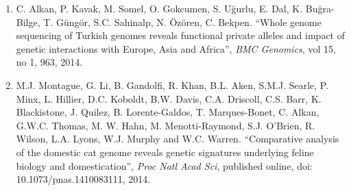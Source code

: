 \begin{enumerate}[i)]
\begin{enumerate}
\item C. Alkan, P. Kavak, M. Somel, O. Gokcumen, S. Uğurlu, E. Dal, K. Buğra-Bilge,  T. Güngör, S.C. Sahinalp, N. Özören, C. Bekpen. ``Whole genome sequencing of Turkish genomes reveals functional private alleles and impact of genetic interactions with Europe, Asia and Africa'', {\em BMC Genomics}, vol 15, no 1, 963, 2014.


\item M.J. Montague, G. Li, B. Gandolfi, R. Khan, B.L. Aken, S.M.J. Searle, P. Minx, L. Hillier, D.C. Koboldt, B.W. Davis, C.A. Driscoll, C.S. Barr, K. Blackistone, J. Quilez, B. Lorente-Galdos, T. Marques-Bonet, C. Alkan, G.W.C. Thomas, M. W. Hahn, M. Menotti-Raymond, S.J. O’Brien, R. Wilson, L.A. Lyons, W.J. Murphy and W.C. Warren. ``Comparative analysis of the domestic cat genome reveals genetic signatures underlying feline biology and domestication'', {\em Proc Natl Acad Sci}, published online, doi: 10.1073/pnas.1410083111, 2014.

\end{enumerate}


\end{enumerate}


